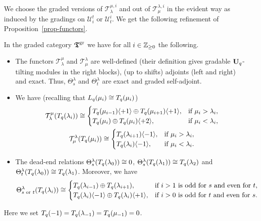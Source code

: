 We choose the graded versions of 
$\mathcal T_{\lambda}^{\mu,i}$ and out of $\mathcal T^{\lambda,i}_{\mu}$ 
in the evident way as induced by the gradings on $\mathcal U_i^t$ or 
$\mathcal U^i_t$.
We get the following refinement of Proposition~\ref{prop-functors}.
\begin{cor}\label{cor-funcgrad3}
In the graded category $\boldsymbol{\mathfrak{T}}^{\mathrm{gr}}$ we have for all 
$i\in\mathbb{Z}_{\geq 0}$ the following.
\begin{itemize}
\item[(a)] The functors 
$\mathcal T_{\lambda}^{\mu}$ and $\mathcal T^{\lambda}_{\mu}$ are 
well-defined (their definition gives gradable $\boldsymbol{\mathrm{U}}_q$-tilting modules in the 
right blocks), (up to shifts) 
adjoints (left and right) and 
exact. Thus, $\Theta^{\lambda}_s$ and $\Theta^{\lambda}_t$ are exact and graded self-adjoint.
\item[(b)] We have (recalling that $L_q({\mu_i})\cong T_q({\mu_i})$)
\begin{gather*}
\mathcal T_{\lambda}^{\mu}(T_q({\lambda_i}))\cong\begin{cases}T_q({\mu_{i-1}})\langle+1\rangle\oplus T_q({\mu_{i+1}})\langle+1\rangle,  & \text{if }\mu_i>\lambda_i,\\
  T_q({\mu_i})\oplus T_q({\mu_i})\langle+2\rangle,  & \text{if }\mu_i<\lambda_i,\end{cases}
\\
\mathcal T^{\lambda}_{\mu}(T_q({\mu_i}))\cong\begin{cases}T_q({\lambda_{i+1}})\langle-1\rangle,  & \text{if }\mu_i>\lambda_i,\\
 T_q({\lambda_{i}})\langle-1\rangle,  & \text{if }\mu_i<\lambda_i.\end{cases}
\end{gather*}
\item[(c)] The dead-end relations $\Theta^{\lambda}_s(T_q({\lambda_0}))\cong0$, $\Theta^{\lambda}_s(T_q({\lambda_1}))\cong T_q({\lambda_2})$ and $\Theta^{\lambda}_t(T_q({\lambda_0}))\cong T_q({\lambda_1})$. Moreover, we have
\[
\Theta^{\lambda}_{s\text{ or }t}(T_q({\lambda_i}))\cong\begin{cases}T_q({\lambda_{i-1}})\oplus T_q({\lambda_{i+1}}) ,  & \text{if }i>1\text{ is odd for }s\text{ and even for }t,\\
  T_q({\lambda_{i}})\langle-1\rangle\oplus T_q({\lambda_{i}})\langle+1\rangle ,  & \text{if }i>0\text{ is odd for }t\text{ and even for }s.\end{cases}
\]
\end{itemize}
Here we set $T_q({-1})=T_q({\lambda_{-1}})=T_q({\mu_{-1}})=0$.\makeqed
\end{cor}



